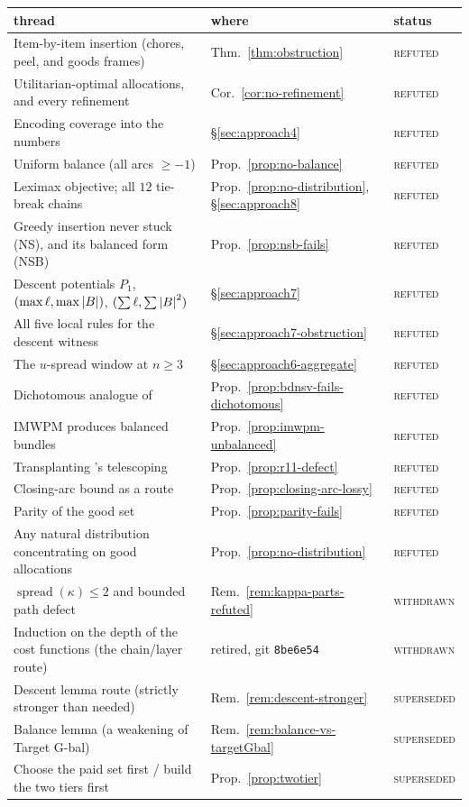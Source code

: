 \begin{center}\small
\begin{tabular}{@{}p{}p{}p{}@{}}
\toprule
thread & where & status \\
\midrule
Item-by-item insertion (chores, peel, and goods frames)
  & Thm.~\ref{thm:obstruction} & \textsc{refuted} \\
Utilitarian-optimal allocations, and every refinement
  & Cor.~\ref{cor:no-refinement} & \textsc{refuted} \\
Encoding coverage into the numbers
  & \S\ref{sec:approach4} & \textsc{refuted} \\
Uniform balance (all arcs $\ge -1$)
  & Prop.~\ref{prop:no-balance} & \textsc{refuted} \\
Leximax objective; all $12$ tie-break chains
  & Prop.~\ref{prop:no-distribution}, \S\ref{sec:approach8} & \textsc{refuted} \\
Greedy insertion never stuck (NS), and its balanced form (NSB)
  & Prop.~\ref{prop:nsb-fails} & \textsc{refuted} \\
Descent potentials $P_1$, $(\max\ell,\max\left\lvert B\right\rvert)$, $(\sum\ell,\sum\left\lvert B\right\rvert^2)$
  & \S\ref{sec:approach7} & \textsc{refuted} \\
All five local rules for the descent witness
  & \S\ref{sec:approach7-obstruction} & \textsc{refuted} \\
The $u$-spread window at $n \ge 3$
  & \S\ref{sec:approach6-aggregate} & \textsc{refuted} \\
Dichotomous analogue of \cite[Thm.~1.3]{BDNSV20}
  & Prop.~\ref{prop:bdnsv-fails-dichotomous} & \textsc{refuted} \\
IMWPM produces balanced bundles
  & Prop.~\ref{prop:imwpm-unbalanced} & \textsc{refuted} \\
Transplanting \cite{LMS26}'s telescoping
  & Prop.~\ref{prop:r11-defect} & \textsc{refuted} \\
Closing-arc bound as a route
  & Prop.~\ref{prop:closing-arc-lossy} & \textsc{refuted} \\
Parity of the good set
  & Prop.~\ref{prop:parity-fails} & \textsc{refuted} \\
Any natural distribution concentrating on good allocations
  & Prop.~\ref{prop:no-distribution} & \textsc{refuted} \\
$\operatorname{spread}(\kappa) \le 2$ and bounded path defect
  & Rem.~\ref{rem:kappa-parts-refuted} & \textsc{withdrawn} \\
Induction on the depth of the cost functions (the chain/layer route)
  & retired, git \texttt{8be6e54} & \textsc{withdrawn} \\
Descent lemma route (strictly stronger than needed)
  & Rem.~\ref{rem:descent-stronger} & \textsc{superseded} \\
Balance lemma (a weakening of Target G-bal)
  & Rem.~\ref{rem:balance-vs-targetGbal} & \textsc{superseded} \\
Choose the paid set first / build the two tiers first
  & Prop.~\ref{prop:twotier} & \textsc{superseded} \\
\bottomrule
\end{tabular}
\end{center}

